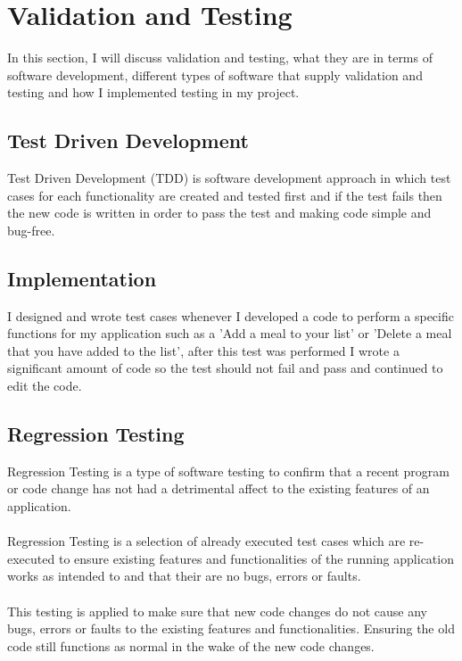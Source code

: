 \section{Validation and Testing}

In this section, I will discuss validation and testing, what they are in terms of software development, different types of software that supply validation and testing and how I implemented testing in my project.

\subsection{Test Driven Development}

Test Driven Development (TDD) is software development approach in which test cases for each functionality are created and tested first and if the test fails then the new code is written in order to pass the test and making code simple and bug-free.

\subsection{Implementation}

I designed and wrote test cases whenever I developed a code to perform a specific functions for my application such as a 'Add a meal to your list' or 'Delete a meal that you have added to the list', after this test was performed I wrote a significant amount of code so the test should not fail and pass and continued to edit the code.

\subsection{Regression Testing}

Regression Testing is a type of software testing to confirm that a recent program or code change has not had a detrimental affect to the existing features of an application.\\ \\
Regression Testing is a selection of already executed test cases which are re-executed to ensure existing features and functionalities of the running application works as intended to and that their are no bugs, errors or faults.\\ \\
This testing is applied to make sure that new code changes do not cause any bugs, errors or faults to the existing features and functionalities. Ensuring the old code still functions as normal in the wake of the new code changes.

